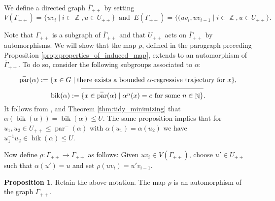 \documentclass{article}
\DeclareMathOperator\bik{bik}
\DeclareMathOperator\parb{par}
\DeclareMathOperator\bbN{\mathbb{N}}
\DeclareMathOperator\bbZ{\mathbb{Z}}
\theoremstyle{definition}
\newtheorem{proposition}[theorem]{Proposition}
\begin{document}
We define a directed graph $\overline{\Gamma}_{++}$ by setting 
\[V(\overline{\Gamma}_{++}) = \{uv_{i}\mid i\in\bbZ,u\in U_{++}\} \ \text{ and }\ E(\overline{\Gamma}_{++}) = \{(uv_{i},uv_{i - 1}\mid i\in\bbZ,u\in U_{++}\}.\]

Note that $\Gamma_{++}$ is a subgraph of $\overline{\Gamma}_{++}$ and that $U_{++}$ acts on $\overline{\Gamma}_{++}$ by automorphisms. We will show that the map $\rho$, defined in the paragraph preceding Proposition \ref{prop:properties_of_induced_map}, extends to an automorphism of $\overline{\Gamma}_{++}$. To do so, consider the following subgroups associated to $\alpha$:
\begin{displaymath}
  \parb^{-}(\alpha):=\{x\in G\mid\hbox{there exists a bounded }\alpha\hbox{-regressive trajectory for }x\},
\end{displaymath}
\begin{displaymath}
  \bik(\alpha):= \overline{\{x\in \parb^{-}(\alpha)\mid\alpha^{n}(x) = e \hbox{ for some }n\in\bbN\}}.
\end{displaymath}
It follows from \cite[Proposition 20]{Wil15}, \cite[Definition 12]{Wil15} and Theorem \ref{thm:tidy_minimizing} that $\alpha(\bik(\alpha)) = \bik(\alpha)\le U$. The same proposition implies that for $u_1,u_2\in U_{++}\le \parb^{-}(\alpha)$ with $\alpha(u_1) = \alpha(u_2)$ we have $u_1^{-1}u_2\in\bik(\alpha)\le U$.

Now define $\rho: \overline{\Gamma}_{++}\to \overline{\Gamma}_{++}$ as follows: Given $uv_{i}\in V(\overline{\Gamma}_{++})$, choose $u'\in U_{++}$ such that $\alpha(u') = u$ and set $\rho(uv_{i}) = u'v_{i-1}$.

\begin{proposition}
Retain the above notation. The map $\rho$ is an automorphism of the graph $\overline{\Gamma}_{++}$.
\end{proposition}
\end{document}
